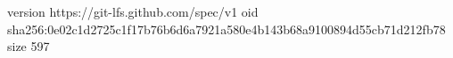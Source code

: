 version https://git-lfs.github.com/spec/v1
oid sha256:0e02c1d2725c1f17b76b6d6a7921a580e4b143b68a9100894d55cb71d212fb78
size 597

